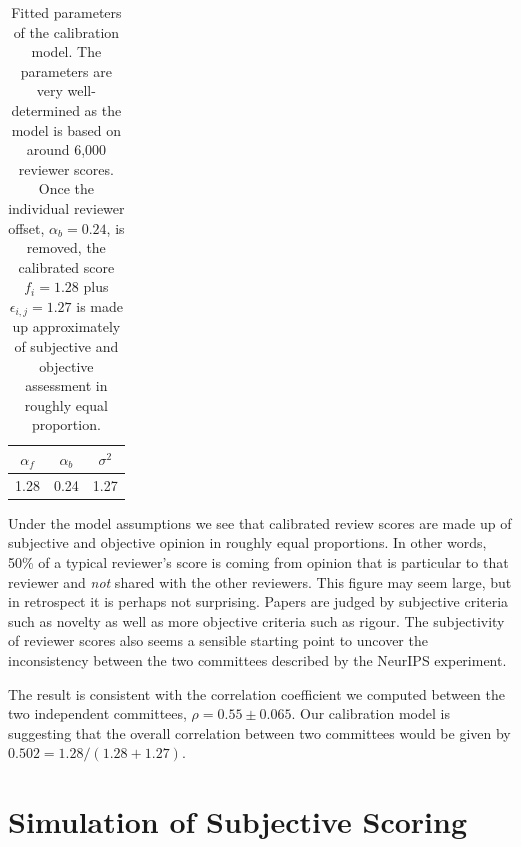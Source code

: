 \documentclass[twoside]{article}
\begin{document}
\begin{table}[htb]
  \label{table-fitted-calibration-parameters}
  \caption{Fitted parameters of the calibration model. The parameters
    are very well-determined as the model is based on around 6,000
    reviewer scores. Once the individual reviewer offset,
    $\alpha_b=0.24$, is removed, the calibrated score $f_i = 1.28$
    plus $\epsilon_{i,j}=1.27$ is made up approximately of subjective
    and objective assessment in roughly equal proportion.}
  \begin{center}
  \begin{tabular}{ccc}
    $\alpha_f$ & $\alpha _b$ & $\sigma^2$ \\ \hline
    1.28 & 0.24 & 1.27
  \end{tabular}
  \end{center}
\end{table}  

Under the model assumptions we see that calibrated review scores are
made up of subjective and objective opinion in roughly equal
proportions. In other words, 50\% of a typical reviewer's score is
coming from opinion that is particular to that reviewer and \emph{not}
shared with the other reviewers. This figure may seem large, but in
retrospect it is perhaps not surprising. Papers are judged by
subjective criteria such as novelty as well as more objective criteria
such as rigour. The subjectivity of reviewer scores also seems a
sensible starting point to  uncover the inconsistency between the two
committees described by the NeurIPS experiment. 

The result is consistent with the correlation coefficient we computed
between the two independent committees, $\rho = 0.55 \pm 0.065$. Our
calibration model is suggesting that the overall correlation between
two committees would be given by $0.502 = 1.28/(1.28+1.27)$.

\section{Simulation of Subjective Scoring}\label{sec:simulation-of-subjective-scoring}
\end{document}
